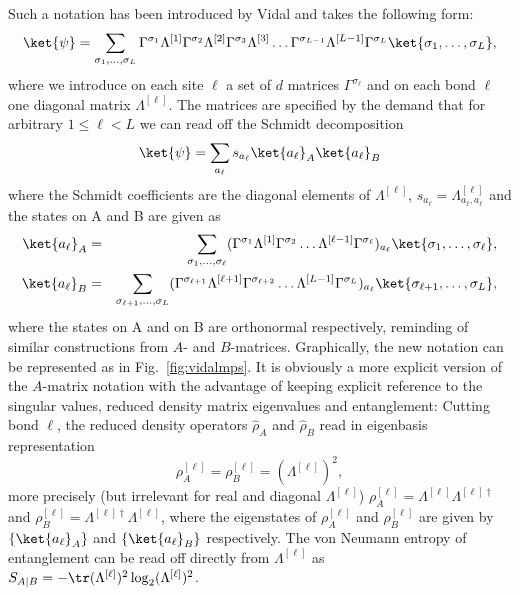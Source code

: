 Such a notation has been introduced by Vidal\cite{Vidal03a} and takes the following form:
\begin{equation}
\ket{\psi} = \sum_{\sigma_1,\ldots,\sigma_L} \Gamma^{\sigma_1} \Lambda^{[1]}  \Gamma^{\sigma_2} \Lambda^{[2]}  \Gamma^{\sigma_3} \Lambda^{[3]} \ldots  \Gamma^{\sigma_{L-1}} \Lambda^{[L-1]}  \Gamma^{\sigma_L} \ket{\sigma_1,\ldots,\sigma_L} ,
\label{eq:canonicalform}
\end{equation} 
where we introduce on each site $\ell$ a set of $d$ matrices $\Gamma^{\sigma_\ell}$ and on each bond $\ell$ one diagonal matrix $\Lambda^{[\ell]}$. The matrices are specified by the demand that for arbitrary $1\leq \ell < L$ we can read off the Schmidt decomposition
\begin{equation}
\ket{\psi} = \sum_{a_\ell} s_{a_\ell} \ket{a_\ell}_A \ket{a_\ell}_B
\end{equation}
where the Schmidt coefficients are the diagonal elements of $\Lambda^{[\ell]}$, $s_{a_\ell} = \Lambda^{[\ell]}_{a_\ell,a_\ell}$ and the states on A and B are given as
\begin{eqnarray}
\ket{a_\ell}_A &=& \sum_{\sigma_1,\ldots,\sigma_\ell}
 (\Gamma^{\sigma_1}\Lambda^{[1]}\Gamma^{\sigma_2} \ldots \Lambda^{[\ell-1]} \Gamma^{\sigma_\ell})_{a_{\ell}}
\ket{\sigma_1,\ldots,\sigma_\ell}, \\
\ket{a_\ell}_B &=& \sum_{\sigma_{\ell+1},\ldots,\sigma_L} 
(\Gamma^{\sigma_{\ell+1}}\Lambda^{[\ell+1]}\Gamma^{\sigma_{\ell+2}} \ldots \Lambda^{[L-1]} \Gamma^{\sigma_L})_{a_\ell}
\ket{\sigma_{\ell+1},\ldots,\sigma_L},
\end{eqnarray}
where the states on A and on B are orthonormal respectively, reminding of similar constructions from $A$- and $B$-matrices. Graphically, the new notation can be represented as in Fig.~\ref{fig:vidalmps}. It is obviously a more explicit version of the $A$-matrix notation with the advantage of keeping explicit reference to the singular values, reduced density matrix eigenvalues and entanglement: Cutting bond $\ell$, the reduced density operators $\hat{\rho}_A$ and $\hat{\rho}_B$ read in eigenbasis representation
\begin{equation}
\rho_A^{[\ell]} = \rho_B^{[\ell]} = (\Lambda^{[\ell]})^2 ,
\end{equation}
more precisely (but irrelevant for real and diagonal $\Lambda^{[\ell]}$) $\rho_A^{[\ell]} = \Lambda^{[\ell]}\Lambda^{[\ell]\dagger}$ and $\rho_B^{[\ell]} = \Lambda^{[\ell]\dagger}\Lambda^{[\ell]}$,
where the eigenstates of $\rho_A^{[\ell]}$ and $\rho_B^{[\ell]}$ are given by $\{ \ket{a_\ell}_A \}$ and $\{ \ket{a_\ell}_B \}$ respectively. The von Neumann entropy of entanglement can be read off directly from $\Lambda^{[\ell]}$ as $S_{A|B} = -\tr (\Lambda^{[\ell]})^2 \log_2 (\Lambda^{[\ell]})^2$. 

